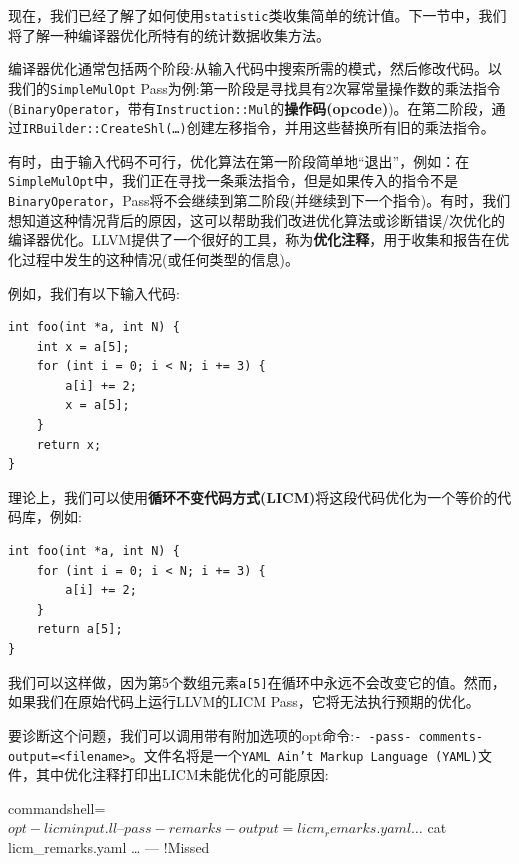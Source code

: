 现在，我们已经了解了如何使用\texttt{statistic}类收集简单的统计值。下一节中，我们将了解一种编译器优化所特有的统计数据收集方法。


编译器优化通常包括两个阶段:从输入代码中搜索所需的模式，然后修改代码。以我们的\texttt{SimpleMulOpt} Pass为例:第一阶段是寻找具有2次幂常量操作数的乘法指令(\texttt{BinaryOperator}，带有\texttt{Instruction::Mul}的\textbf{操作码(opcode)})。在第二阶段，通过\texttt{IRBuilder::CreateShl(…)}创建左移指令，并用这些替换所有旧的乘法指令。

有时，由于输入代码不可行，优化算法在第一阶段简单地“退出”，例如：在\texttt{SimpleMulOpt}中，我们正在寻找一条乘法指令，但是如果传入的指令不是\texttt{BinaryOperator}，Pass将不会继续到第二阶段(并继续到下一个指令)。有时，我们想知道这种情况背后的原因，这可以帮助我们改进优化算法或诊断错误/次优化的编译器优化。LLVM提供了一个很好的工具，称为\textbf{优化注释}，用于收集和报告在优化过程中发生的这种情况(或任何类型的信息)。

例如，我们有以下输入代码:

\begin{lstlisting}[style=styleCXX]
int foo(int *a, int N) {
	int x = a[5];
	for (int i = 0; i < N; i += 3) {
		a[i] += 2;
		x = a[5];
	}
	return x;
}
\end{lstlisting}

理论上，我们可以使用\textbf{循环不变代码方式(LICM)}将这段代码优化为一个等价的代码库，例如:

\begin{lstlisting}[style=styleCXX]
int foo(int *a, int N) {
	for (int i = 0; i < N; i += 3) {
		a[i] += 2;
	}
	return a[5];
}
\end{lstlisting}

我们可以这样做，因为第5个数组元素\texttt{a[5]}在循环中永远不会改变它的值。然而，如果我们在原始代码上运行LLVM的LICM Pass，它将无法执行预期的优化。

要诊断这个问题，我们可以调用带有附加选项的opt命令:\texttt{-\,-pass- comments-output=<filename>}。文件名将是一个\texttt{YAML Ain't Markup Language (YAML)}文件，其中优化注释打印出LICM未能优化的可能原因:

\begin{tcblisting}{commandshell={}}
$ opt -licm input.ll –pass-remarks-output=licm_remarks.yaml …
$ cat licm_remarks.yaml
…
--- !Missed
\end{tcblisting}



